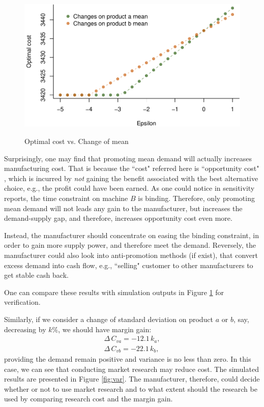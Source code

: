 \documentclass[a4paper,11pt]{article}
\begin{document}
\begin{figure}[htb]
\centering
\caption{Optimal cost vs. Change of mean}
\includegraphics{Example-figure_files/figure-latex/mean-1.pdf}
\label{fig:mean}
\end{figure}

Surprisingly, one may find that promoting mean demand will actually increases manufacturing cost. That is because the ``cost" referred here is ``opportunity cost" \cite{Ch12,Po02}, which is incurred by \emph{not} gaining the benefit associated with the best alternative choice, e.g., the profit could have been earned. As one could notice in sensitivity reports, the time constraint on machine $B$ is binding. Therefore, only promoting mean demand will not leads any gain to the manufacturer, but increases the demand-supply gap, and therefore, increases opportunity cost even more.

Instead, the manufacturer should concentrate on easing the binding constraint, in order to gain more supply power, and therefore meet the demand. Reversely, the manufacturer could also look into anti-promotion methods (if exist), that convert excess demand into cash flow, e.g., ``selling" customer to other manufacturers to get stable cash back.

One can compare these results with simulation outputs in Figure \ref{fig:mean} for verification.

Similarly, if we consider a change of standard deviation on product $a$ or $b$, say, decreasing by $k\%$, we should have margin gain:
\[
\begin{aligned}
    \Delta \, C_{va} = -12.1 \, k_a,\\
    \Delta \, C_{vb} = -22.1 \, k_b,
\end{aligned}
\]
providing the demand remain positive and variance is no less than zero. In this case, we can see that conducting market research may reduce cost. The simulated results are presented in Figure \ref{fig:var}. The manufacturer, therefore, could decide whether or not to use market research and to what extent should the research be used by comparing research cost and the margin gain.
\end{document}
